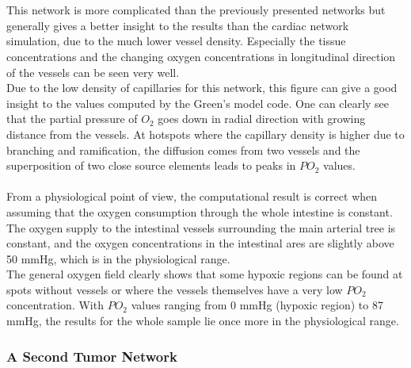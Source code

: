 %
\\
\\This network is more complicated than the previously presented networks but generally gives a better insight to the results than the cardiac network simulation, due to the much lower vessel density. Especially the tissue concentrations and the changing oxygen concentrations in longitudinal direction of the vessels can be seen very well.
\\Due to the low density of capillaries for this network, this figure can give a good insight to the values computed by the Green's model code. One can clearly see that the partial pressure of $O_2$ goes down in radial direction with growing distance from the vessels. At hotspots where the capillary density is higher due to branching and ramification, the diffusion comes from two vessels and the superposition of two close source elements leads to peaks in $PO_2$ values.\\
\\From a physiological point of view, the computational result is correct when assuming that the oxygen consumption through the whole intestine is constant. The oxygen supply to the intestinal vessels surrounding the main arterial tree is constant, and the oxygen concentrations in the intestinal ares are slightly above 50 mmHg, which is in the physiological range.
\\The general oxygen field clearly shows that some hypoxic regions can be found at spots without vessels or where the vessels themselves have a very low $PO_2$ concentration. With $PO_2$ values ranging from $0$ mmHg (hypoxic region) to 87 mmHg, the results for the whole sample lie once more in the physiological range.

\newpage
\subsubsection*{A Second Tumor Network}
\label{Tumor}

